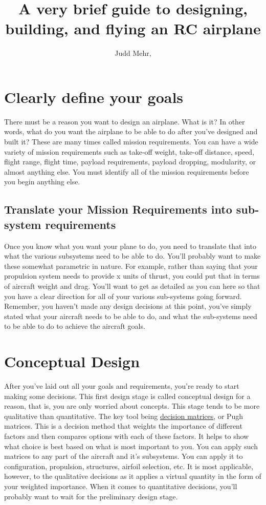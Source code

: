 \documentclass[report]{byu-aero}
\title{\color{BYUblue} A very brief guide to designing, building, and flying an RC airplane}
\author{Judd Mehr, }
\begin{document}
\maketitle
\section{Clearly define your goals}

There must be a reason you want to design an airplane. What is it? In other words, what do you want the airplane to be able to do after you've designed and built it? These are many times called mission requirements. You can have a wide variety of mission requirements such as take-off weight, take-off distance, speed, flight range, flight time, payload requirements, payload dropping, modularity, or almost anything else.  You must identify all of the mission requirements before you begin anything else. 

\subsection{Translate your Mission Requirements into sub-system requirements}

Once you know what you want your plane to do, you need to translate that into what the various subsystems need to be able to do. You'll probably want to make these somewhat parametric in nature. For example, rather than saying that your propulsion system needs to provide x units of thrust, you could put that in terms of aircraft weight and drag. You'll want to get as detailed as you can here so that you have a clear direction for all of your various sub-systems going forward. Remember, you haven't made any design decisions at this point, you've simply stated what your aircraft needs to be able to do, and what the sub-systems need to be able to do to achieve the aircraft goals.

\section{Conceptual Design}

After you've laid out all your goals and requirements, you're ready to start making some decisions. This first design stage is called conceptual design for a reason, that is, you are only worried about concepts. This stage tends to be more qualitative than quantitative. The key tool being \href{https://en.wikipedia.org/wiki/Decision_matrix}{decision matrices}, or Pugh matrices. This is a decision method that weights the importance of different factors and then compares options with each of these factors. It helps to show what choice is best based on what is most important to you. You can apply such matrices to any part of the aircraft and it's subsystems.  You can apply it to configuration, propulsion, structures, airfoil selection, etc. It is most applicable, however, to the qualitative decisions as it applies a virtual quantity in the form of your weighted importance. When it comes to quantitative decisions, you'll probably want to wait for the preliminary design stage.
\end{document}
